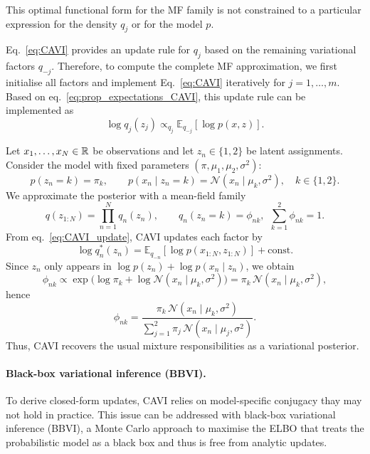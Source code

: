 \begin{remark}[]
    This optimal functional form for the MF family is not constrained to a particular expression for the density $q_j$ or for the model $p$. 
\end{remark}


\begin{remark}
    Eq.~\eqref{eq:CAVI} provides an update rule for $q_j$ based on the remaining variational factors $q_{-j}$. Therefore, to compute the complete MF approximation, we first initialise all factors and implement Eq.~\eqref{eq:CAVI} iteratively for $j=1,\ldots,m$. Based on eq.~\eqref{eq:prop_expectations_CAVI}, this update rule can be implemented as 
    \begin{equation}
        \log q_j(z_j) \propto_{q_j} \mathbb{E}_{q_{-j}}\left[\log p(x,z)\right].
        \label{eq:CAVI_update}
    \end{equation}    
\end{remark}


\begin{example}
Let $x_1,\dots,x_N\in{\mathbb R}$ be observations and let $z_n\in\{1,2\}$ be latent
assignments. Consider the model with fixed parameters $(\pi,\mu_1,\mu_2,\sigma^2)$:
\[
p(z_n=k)=\pi_k,
\qquad
p(x_n\mid z_n=k)=\mathcal N(x_n\mid \mu_k,\sigma^2),
\quad k\in\{1,2\}.
\]
We approximate the posterior with a mean-field family
\[
q(z_{1:N})=\prod_{n=1}^N q_n(z_n),
\qquad
q_n(z_n=k)=\phi_{nk},\ \ \sum_{k=1}^2\phi_{nk}=1.
\]
From eq.~\eqref{eq:CAVI_update}, CAVI updates each factor by
\[
\log q_n^*(z_n)=\mathbb{E}_{q_{-n}}[\log p(x_{1:N},z_{1:N})]+\text{const}.
\]
Since $z_n$ only appears in $\log p(z_n)+\log p(x_n\mid z_n)$, we obtain
\[
\phi_{nk}
\propto
\exp\!\Big(\log \pi_k + \log \mathcal N(x_n\mid \mu_k,\sigma^2)\Big)
=
\pi_k\,\mathcal N(x_n\mid \mu_k,\sigma^2),
\]
hence
\[
\phi_{nk}
=
\frac{\pi_k\,\mathcal N(x_n\mid \mu_k,\sigma^2)}
{\sum_{j=1}^2 \pi_j\,\mathcal N(x_n\mid \mu_j,\sigma^2)}.
\]
Thus, CAVI recovers the usual mixture responsibilities as a variational posterior.
\end{example}



\paragraph{Black-box variational inference (BBVI).}
To derive closed-form updates, CAVI relies on model-specific conjugacy thay may not hold in practice. This issue can be addressed with black-box variational
inference (BBVI), a Monte Carlo approach to maximise the ELBO that  treats the probabilistic model as a black box and thus is free from analytic updates.

